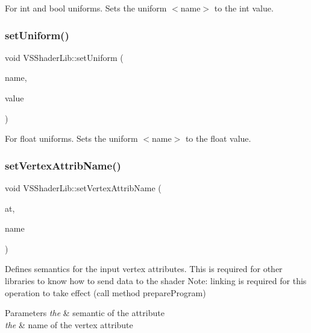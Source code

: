 For int and bool uniforms. Sets the uniform $<$name$>$ to the int value. 

\mbox{\label{class_v_s_shader_lib_a0ce1b5965910417965d321286ee552b7}} 
\subsubsection{\texorpdfstring{set\+Uniform()}{setUniform()}\hspace{0.1cm}{\footnotesize\ttfamily [3/3]}}
{\footnotesize\ttfamily void V\+S\+Shader\+Lib\+::set\+Uniform (\begin{DoxyParamCaption}\item[{std\+::string}]{name,  }\item[{float}]{value }\end{DoxyParamCaption})}



For float uniforms. Sets the uniform $<$name$>$ to the float value. 

\mbox{\label{class_v_s_shader_lib_a94ab5e49d1e850f28c3a466f90a5be40}} 
\subsubsection{\texorpdfstring{set\+Vertex\+Attrib\+Name()}{setVertexAttribName()}}
{\footnotesize\ttfamily void V\+S\+Shader\+Lib\+::set\+Vertex\+Attrib\+Name (\begin{DoxyParamCaption}\item[{\hyperlink{class_v_s_shader_lib_ac4141d01d0c856c9ca456e51afd9a2c5}{V\+S\+Shader\+Lib\+::\+Attrib\+Type}}]{at,  }\item[{std\+::string}]{name }\end{DoxyParamCaption})}

Defines semantics for the input vertex attributes. This is required for other libraries to know how to send data to the shader Note\+: linking is required for this operation to take effect (call method prepare\+Program)


\begin{DoxyParams}{Parameters}
{\em the} & semantic of the attribute \\
\hline
{\em the} & name of the vertex attribute \\
\hline
\end{DoxyParams}
\mbox{\label{class_v_s_shader_lib_a7e9e011a122f2c0956ba6c885864b00b}} 
